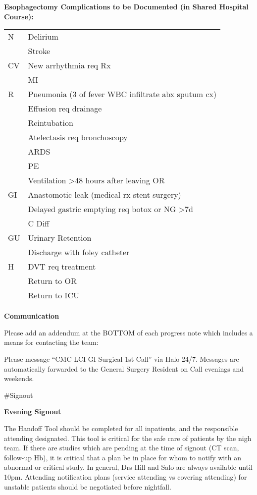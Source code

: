 \documentclass[
]{book}
\begin{document}
\textbf{Esophagectomy Complications to be Documented (in Shared Hospital Course):}

\begin{longtable}[]{@{}ll@{}}
\toprule
& \\
\midrule
\endhead
N & Delirium \\
& Stroke \\
CV & New arrhythmia req Rx \\
& MI \\
R & Pneumonia (3 of fever \textbar{} WBC \textbar{} infiltrate \textbar{} abx \textbar{} sputum cx) \\
& Effusion req drainage \\
& Reintubation \\
& Atelectasis req bronchoscopy \\
& ARDS \\
& PE \\
& Ventilation \textgreater48 hours after leaving OR \\
GI & Anastomotic leak (medical rx \textbar{} stent \textbar{} surgery) \\
& Delayed gastric emptying req botox or NG \textgreater7d \\
& C Diff \\
GU & Urinary Retention \\
& Discharge with foley catheter \\
H & DVT req treatment \\
& Return to OR \\
& Return to ICU \\
\bottomrule
\end{longtable}

\textbf{Communication}

Please add an addendum at the BOTTOM of each progress note which includes a means for contacting the team:

Please message ``CMC LCI GI Surgical 1st Call'' via Halo 24/7. Messages are automatically forwarded to the General Surgery Resident on Call evenings and weekends.

\#Signout

\textbf{Evening Signout}

The Handoff Tool should be completed for all inpatients, and the responsible attending designated. This tool is critical for the safe care of patients by the nigh team. If there are studies which are pending at the time of signout (CT scan, follow-up Hb), it is critical that a plan be in place for whom to notify with an abnormal or critical study. In general, Drs Hill and Salo are always available until 10pm. Attending notification plans (service attending vs covering attending) for unstable patients should be negotiated before nightfall.
\end{document}
